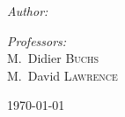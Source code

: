 \begin{titlepage}
\begin{center}
\begin{minipage}[t]{0.6\textwidth}
  \begin{flushleft} \large
    \emph{Author:}\\
    \reportauthor
  \end{flushleft}
\end{minipage}
\begin{minipage}[t]{0.39\textwidth}
  \begin{flushright} \large
    \emph{Professors:} \\
    M.~Didier \textsc{Buchs} \\ %
    M.~David \textsc{Lawrence}\\
  \end{flushright}
\end{minipage}

\vfill

{ \today}%

\end{center}

\end{titlepage}
